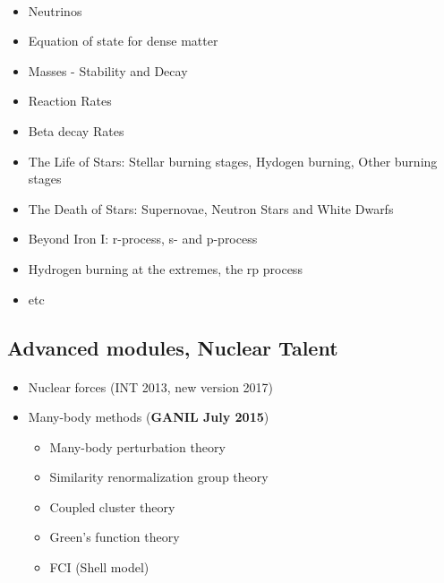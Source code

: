 \documentclass[%
twoside,                 %
final,                   %
10pt]{article}
\begin{document}
\paragraph{}
\begin{itemize}
\item Neutrinos

\item Equation of state for dense matter

\item Masses - Stability and Decay

\item Reaction Rates

\item Beta decay Rates	

\item The Life of Stars: Stellar burning stages, Hydogen burning, Other burning stages

\item The Death of Stars: Supernovae, Neutron Stars and White Dwarfs

\item Beyond Iron I: r-process, s- and p-process

\item Hydrogen burning at the extremes, the rp process

\item etc
\end{itemize}

\noindent




\subsection{Advanced  modules, Nuclear Talent}

\paragraph{}
\begin{itemize}
\item Nuclear forces (INT 2013, new version 2017)

\item Many-body methods (\textbf{GANIL July 2015})
\begin{itemize}

  \item Many-body perturbation theory

  \item Similarity renormalization group theory

  \item Coupled cluster theory

  \item Green's function theory

  \item FCI (Shell model)
\end{itemize}

\noindent
\end{itemize}
\end{document}
